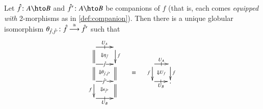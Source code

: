\documentclass{amsart}
\begin{document}
\begin{lem}\label{thm:theta}
  Let $\fhat\maps A\hto B$ and $\fhat'\maps A\hto B$ be companions of
  $f$ (that is, each comes \emph{equipped with} 2-morphisms as in
  \autoref{def:companion}).  Then there is a unique globular isomorphism
  $\theta_{\fhat,\fhat'}\maps \fhat\too[\iso]\fhat'$ such that
  \begin{equation}\label{eq:comp-iso}
    \vcenter{\xymatrix@R=1.5pc{
        \ar[r]|-@{|}^-{U_A} \ar@{=}[d] \ar@{}[dr]|{\Downarrow \eta_{\hat{f}}} &  \ar[d]^f\\
        \ar[r]|-{\fhat} \ar@{=}[d] \ar@{}[dr]|{\Downarrow \theta_{\fhat,\fhat'}} &  \ar@{=}[d]\\
        \ar[r]|-{\fhat'} \ar[d]_f \ar@{}[dr]|{\Downarrow \epsilon_{\hat{f}'}} & \ar@{=}[d]\\
        \ar[r]|-@{|}_-{U_B} & }} \quad = \quad
    \vcenter{\xymatrix@-.5pc{ \ar[r]|-@{|}^-{U_A} \ar[d]_f
        \ar@{}[dr]|{\Downarrow U_f} &  \ar[d]^f\\
        \ar[r]|-@{|}_-{U_B} & .}}
  \end{equation}
\end{lem}
\end{document}

